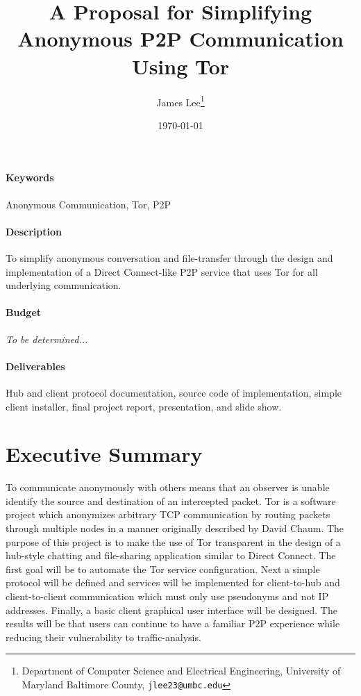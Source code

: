 \documentclass[12pt]{article}
\title{A Proposal for Simplifying Anonymous P2P Communication Using Tor}
\author{James Lee\thanks{
	Department of Computer Science and Electrical Engineering,
	University of Maryland Baltimore County,
	{\tt jlee23@umbc.edu}}}
\date{\today}
\begin{document}
\maketitle

\paragraph{Keywords} Anonymous Communication, Tor, P2P

\paragraph{Description} To simplify anonymous conversation and file-transfer through the design and implementation of a Direct Connect-like P2P service that uses Tor for all underlying communication.

\paragraph{Budget} \emph{To be determined...}

\paragraph{Deliverables} Hub and client protocol documentation, source code of implementation, simple client installer, final project report, presentation, and slide show.

\section{Executive Summary}
To communicate anonymously with others means that an observer is unable identify the source and destination of an intercepted packet.  Tor is a software project which anonymizes arbitrary TCP communication by routing packets through multiple nodes in a manner originally described by David Chaum.  The purpose of this project is to make the use of Tor transparent in the design of a hub-style chatting and file-sharing application similar to Direct Connect.  The first goal will be to automate the Tor service configuration.  Next a simple protocol will be defined and services will be implemented for client-to-hub and client-to-client communication which must only use pseudonyms and not IP addresses.  Finally, a basic client graphical user interface will be designed.  The results will be that users can continue to have a familiar P2P experience while reducing their vulnerability to traffic-analysis.
\end{document}

